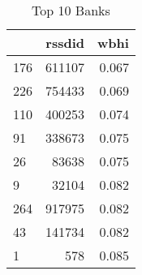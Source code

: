 \begin{table}
\centering
\caption{Top 10 Banks}
\label{tab:bottom10}
\begin{tabular}{lrr}
\toprule
{} &  rssdid &  wbhi \\
\midrule
176 &  611107 & 0.067 \\
226 &  754433 & 0.069 \\
110 &  400253 & 0.074 \\
91  &  338673 & 0.075 \\
26  &   83638 & 0.075 \\
9   &   32104 & 0.082 \\
264 &  917975 & 0.082 \\
43  &  141734 & 0.082 \\
1   &     578 & 0.085 \\
\bottomrule
\end{tabular}
\end{table}
